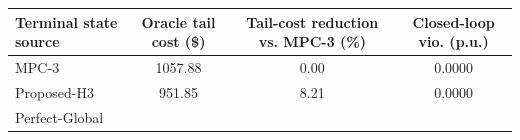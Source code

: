 \begin{tabular}{lccc}
\toprule
Terminal state source & Oracle tail cost (\$) & Tail-cost reduction vs. MPC-3 (\%) & Closed-loop vio. (p.u.) \\
\midrule
MPC-3 & 1057.88 & 0.00 & 0.0000 \\
Proposed-H3 & 951.85 & 8.21 & 0.0000 \\
Perfect-Global &  &  &  \\
\bottomrule
\end{tabular}
